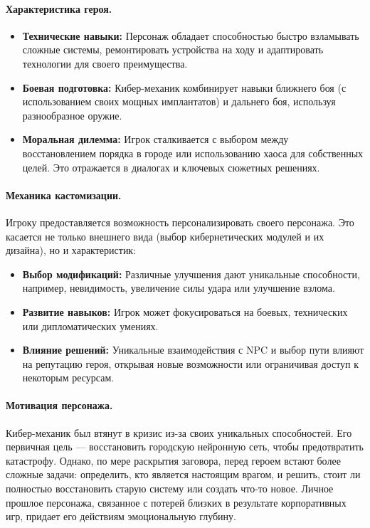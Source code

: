\documentclass{article}
\begin{document}
\paragraph{Характеристика героя.}
\begin{itemize}
    \item \textbf{Технические навыки:} Персонаж обладает способностью быстро взламывать сложные системы, ремонтировать устройства на ходу и адаптировать технологии для своего преимущества.
    \item \textbf{Боевая подготовка:} Кибер-механик комбинирует навыки ближнего боя (с использованием своих мощных имплантатов) и дальнего боя, используя разнообразное оружие.
    \item \textbf{Моральная дилемма:} Игрок сталкивается с выбором между восстановлением порядка в городе или использованию хаоса для собственных целей. Это отражается в диалогах и ключевых сюжетных решениях.
\end{itemize}

\paragraph{Механика кастомизации.}
Игроку предоставляется возможность персонализировать своего персонажа. Это касается не только внешнего вида (выбор кибернетических модулей и их дизайна), но и характеристик:
\begin{itemize}
    \item \textbf{Выбор модификаций:} Различные улучшения дают уникальные способности, например, невидимость, увеличение силы удара или улучшение взлома.
    \item \textbf{Развитие навыков:} Игрок может фокусироваться на боевых, технических или дипломатических умениях.
    \item \textbf{Влияние решений:} Уникальные взаимодействия с NPC и выбор пути влияют на репутацию героя, открывая новые возможности или ограничивая доступ к некоторым ресурсам.
\end{itemize}

\paragraph{Мотивация персонажа.}
Кибер-механик был втянут в кризис из-за своих уникальных способностей. Его первичная цель — восстановить городскую нейронную сеть, чтобы предотвратить катастрофу. Однако, по мере раскрытия заговора, перед героем встают более сложные задачи: определить, кто является настоящим врагом, и решить, стоит ли полностью восстановить старую систему или создать что-то новое. Личное прошлое персонажа, связанное с потерей близких в результате корпоративных игр, придает его действиям эмоциональную глубину.
\end{document}
